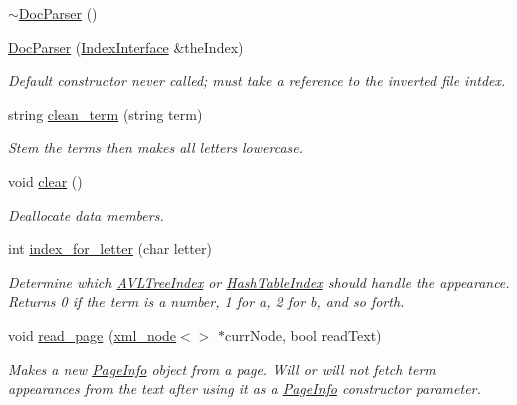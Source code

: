 \begin{DoxyCompactItemize}
\item 
\hyperlink{class_doc_parser_a637fc4d565eaf2927ee9b88bbe23e3cb}{$\sim$\+Doc\+Parser} ()
\item 
\hyperlink{class_doc_parser_a086f00e54fca8038c85c0e235948d75a}{Doc\+Parser} (\hyperlink{class_index_interface}{Index\+Interface} \&the\+Index)
\begin{DoxyCompactList}\small\item\em Default constructor never called; must take a reference to the inverted file intdex. \end{DoxyCompactList}\item 
string \hyperlink{class_doc_parser_a1b127af53e8af16f393b64f46c307d3a}{clean\+\_\+term} (string term)
\begin{DoxyCompactList}\small\item\em Stem the terms then makes all letters lowercase. \end{DoxyCompactList}\item 
void \hyperlink{class_doc_parser_ad92d1a6da7d413abd27ee18a6ed20a30}{clear} ()
\begin{DoxyCompactList}\small\item\em Deallocate data members. \end{DoxyCompactList}\item 
int \hyperlink{class_doc_parser_a7addc81ac337c2688bb9e9d8197db2fc}{index\+\_\+for\+\_\+letter} (char letter)
\begin{DoxyCompactList}\small\item\em Determine which \hyperlink{class_a_v_l_tree_index}{A\+V\+L\+Tree\+Index} or \hyperlink{class_hash_table_index}{Hash\+Table\+Index} should handle the appearance. Returns 0 if the term is a number, 1 for \textquotesingle{}a\textquotesingle{}, 2 for \textquotesingle{}b\textquotesingle{}, and so forth. \end{DoxyCompactList}\item 
void \hyperlink{class_doc_parser_a48cd3949baca573b9be0b4ba24b9c79d}{read\+\_\+page} (\hyperlink{classrapidxml_1_1xml__node}{xml\+\_\+node}$<$$>$ $\ast$curr\+Node, bool read\+Text)
\begin{DoxyCompactList}\small\item\em Makes a new \hyperlink{class_page_info}{Page\+Info} object from a page. Will or will not fetch term appearances from the text after using it as a \hyperlink{class_page_info}{Page\+Info} constructor parameter. \end{DoxyCompactList}\item 
$$
\end{DoxyCompactItemize}
